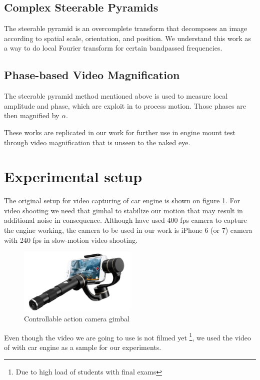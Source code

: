 \documentclass{IEEEtran}
\begin{document}
\subsection{Complex Steerable Pyramids}
The steerable pyramid \cite{119725} is an overcomplete transform that decomposes an image according to spatial scale, orientation, and position. We understand this work as a way to do local Fourier transform for certain bandpassed frequencies.

\subsection{Phase-based Video Magnification}
The steerable pyramid method mentioned above is used to measure local amplitude and phase, which are exploit in \cite{Wadhwa:2013:PVM:2461912.2461966} to process motion. Those phases are then magnified by $\alpha$.

These works are replicated in our work for further use in engine mount test through video magnification that is unseen to the naked eye. 

\section{Experimental setup}

The original setup for video capturing of car engine is shown on figure \ref{fig:setup}. For video shooting we need that gimbal to stabilize our motion that may result in additional noise in consequence. Although \cite{Wadhwa:2013:PVM:2461912.2461966} have used 400 fps camera to capture the engine working, the camera to be used in our work is iPhone 6 (or 7) camera with 240 fps in slow-motion video shooting.

\begin{figure}[h]
	\centering
	\includegraphics[width=0.5\textwidth]{maxresdefault}
	\caption{Controllable action camera gimbal}
	\label{fig:setup}
\end{figure}

Even though the video we are going to use is not filmed yet \footnote{Due to high load of students with final exams}, we used the video of \cite{Wadhwa:2013:PVM:2461912.2461966} with car engine as a sample for our experiments.
\end{document}
